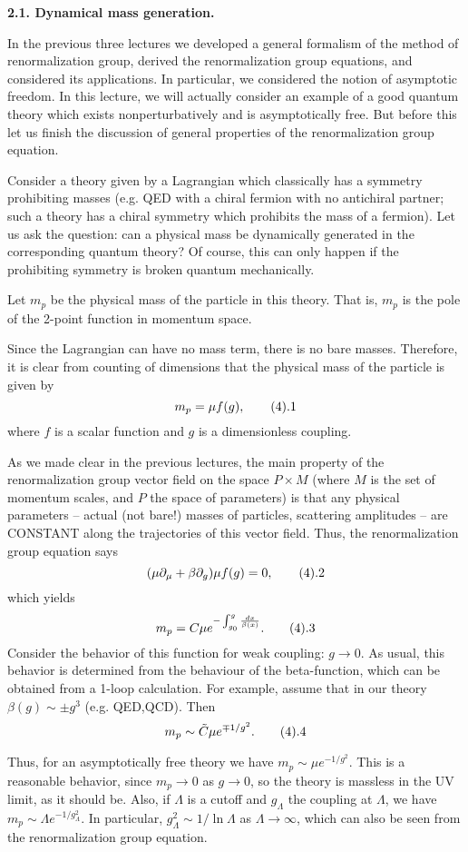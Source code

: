 {\bf 2.1. Dynamical mass generation.}

In the previous three lectures we developed a general formalism 
of the method of renormalization group, derived the renormalization 
group equations, and considered its applications. In particular, we 
considered the notion of asymptotic freedom. In this lecture, we will 
actually consider an example of a good quantum theory which exists 
nonperturbatively and is asymptotically free. But before this let us finish 
the discussion of general properties of the renormalization group equation. 

Consider a theory given by a Lagrangian which classically 
 has a symmetry prohibiting masses (e.g. QED with a chiral fermion 
with no antichiral partner; such a theory has a chiral symmetry
which prohibits the mass of a fermion). Let us ask 
the question: can a physical mass 
be dynamically generated in the corresponding quantum theory? 
Of course, this can only happen if the prohibiting symmetry is broken 
quantum mechanically. 

Let $m_p$ be the physical mass of the particle in this
 theory. That is, $m_p$ is the pole of the 2-point function
in momentum space. 

Since the Lagrangian can have no mass term, there is no bare masses. 
Therefore, it is clear
from counting of dimensions that the physical mass 
of the particle is given by 
$$
m_p=\mu f(g),\tag 4.1
$$
where $f$ is a scalar function and $g$ is a dimensionless coupling. 

As we made clear in the previous lectures, the main property of the 
renormalization  group vector field on the space $P\times M$ 
(where $M$ is the set of momentum scales, and $P$ the space of parameters) 
is that any physical parameters -- actual (not bare!) masses of particles,
scattering amplitudes -- are CONSTANT along the trajectories of this vector 
field. 
Thus, the renormalization group equation says 
$$
(\mu\d_\mu+\beta\d_g)\mu f(g)=0,\tag 4.2
$$
 which yields
$$
m_p=C\mu e^{-\int_{g_0}^g\frac{dx}{\beta(x)}}.\tag 4.3
$$
Consider the behavior of this function for weak coupling: $g\to 0$.
As usual, this behavior is determined from the behaviour of the beta-function, 
which can be obtained from a 1-loop calculation.  
For example, assume that in our theory $\beta(g)\sim \pm g^3$ 
(e.g. QED,QCD). Then 
$$
m_p\sim \tilde C\mu e^{\mp 1/g^2}.\tag 4.4
$$

Thus, for an asymptotically free theory we have $m_p\sim \mu e^{-1/g^2}$.
This is a reasonable behavior, since $m_p\to 0$ as $g\to 0$, so the theory 
is massless in the UV limit, as it should be. 
Also, if $\Lambda$ is a cutoff and $g_\Lambda$ the coupling at $\Lambda$, 
we have $m_p\sim \Lambda e^{-1/g_\Lambda^2}$. In particular, 
$g_\Lambda^2\sim 1/\ln\Lambda$ as $\Lambda\to\infty$, which can 
also be seen from the renormalization group equation. 

